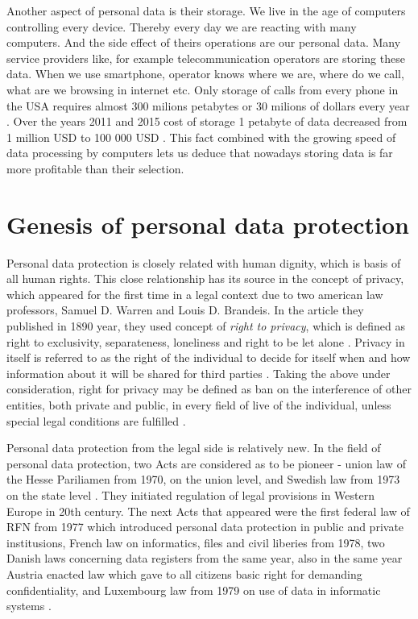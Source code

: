 \documentclass[en, noamssymb]{mgr}
\begin{document}
\indent Another aspect of personal data is their storage. We live in the age of computers controlling every device. Thereby every day we are reacting with many computers. And the side effect of theirs operations are our personal data. Many service providers like, for example telecommunication operators are storing these data. When we use smartphone, operator knows where we are, where do we call, what are we browsing in internet etc. Only storage of calls from every phone in the USA requires almost 300 milions petabytes or 30 milions of dollars every year \cite{dane_i_goliat}. Over the years 2011 and 2015 cost of storage 1 petabyte of data decreased from 1 million USD to 100 000 USD \cite{dane_i_goliat}. This fact combined with the growing speed of data processing by computers lets us deduce that nowadays storing data is far more profitable than their selection.



\section{Genesis of personal data protection}

Personal data protection is closely related with human dignity, which is basis of all human rights. This close relationship has its source in the concept of privacy, which appeared for the first time in a legal context due to two american law professors, Samuel D. Warren and Louis D. Brandeis. In the article they published in 1890 year, they used concept of \textit{right to privacy}, which is defined as right to exclusivity, separateness, loneliness and right to be let alone \cite{geneza_odo}. Privacy in itself is referred to as the right of the individual to decide for itself when and how information about it will be shared for third parties \cite{geneza_odo}. Taking the above under consideration, right for privacy may be defined as ban on the interference of other entities, both private and public, in every field of live of the individual, unless special legal conditions are fulfilled \cite{geneza_odo}.

\indent Personal data protection from the legal side is relatively new. In the field of personal data protection, two Acts are considered as to be pioneer - union law of the Hesse Pariliamen from 1970, on the union level, and Swedish law from 1973 on the state level \cite{prawo_odo}. They initiated regulation of legal provisions in Western Europe 
in 20th century. The next Acts that appeared were the first federal law of RFN from 1977  which introduced personal data protection in public and private institusions, French law on informatics, files and civil liberies from 1978, two Danish laws concerning data registers from the same year, also in the same year Austria enacted law which gave to all citizens basic right for demanding confidentiality, and Luxembourg law from 1979 on use of data in informatic systems \cite{prawo_odo}.
\end{document}
